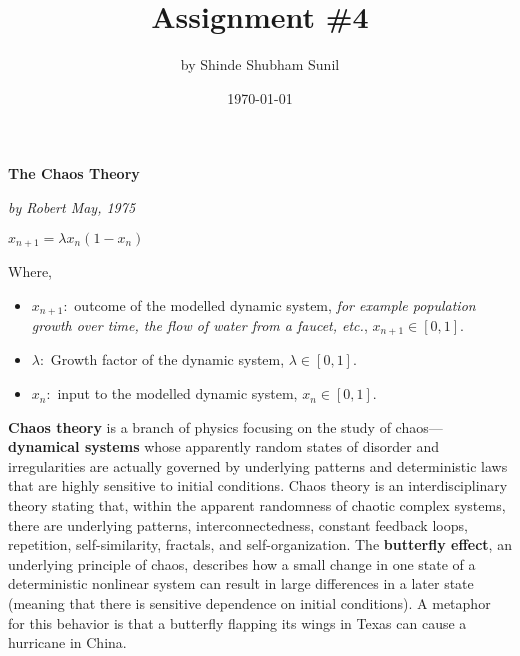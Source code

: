 \documentclass[a4paper, 12pt]{article}
\begin{document}
\title{\textbf{Assignment \#4}}
\author{by Shinde Shubham Sunil}
\date{\today}
\maketitle

\centerline{\huge \textbf{The Chaos Theory}}
\centerline{\textit{by Robert May, 1975}}
\begin{center}
\centerline{\huge $x_{n+1}=\lambda x_n(1-x_n)$}
\end{center}
Where,
\begin{itemize}
    \item $x_{n+1}:$ outcome of the modelled dynamic system, \textit{for example population growth over time, the flow of water from a faucet, etc.}, $x_{n+1}\in[0,1]$.
    \item $\lambda:$ Growth factor of the dynamic system, $\lambda\in [0,1]$.
    \item $x_n:$ input to the modelled dynamic system, $x_{n}\in[0,1]$.  
\end{itemize}
\textbf{Chaos theory} is a branch of physics focusing on the study of chaos—\textbf{dynamical systems} whose apparently random states of disorder and irregularities are actually governed by underlying patterns and deterministic laws that are highly sensitive to initial conditions. Chaos theory is an interdisciplinary theory stating that, within the apparent randomness of chaotic complex systems, there are underlying patterns, interconnectedness, constant feedback loops, repetition, self-similarity, fractals, and self-organization. The \textbf{butterfly effect}, an underlying principle of chaos, describes how a small change in one state of a deterministic nonlinear system can result in large differences in a later state (meaning that there is sensitive dependence on initial conditions). A metaphor for this behavior is that a butterfly flapping its wings in Texas can cause a hurricane in China.
\end{document}
